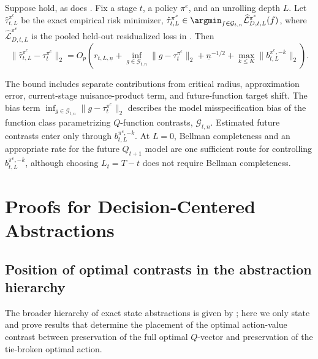 \documentclass[opre,nonblindrev]{informs4}
\let\arxivSavedArgmin\argmin
\let\argmin\undefined
\let\argmin\arxivSavedArgmin
\providecommand{\cG}{\mathcal G}
\newcommand{\norm}[1]{\lVert#1\rVert}
\newcommand{\blipadv}{\tau}
\begin{document}
\begin{theorem}\label{thm-mse-rates-policy-evaluation-apx}
Suppose
hold, as does .
Fix a stage $t$, a policy $\pi^e$, and an unrolling depth $L$.
Let $\hat\blipadv_{t,L}^{\pi^e}$ be the exact empirical risk minimizer,
$
\hat\blipadv_{t,L}^{\pi^e}
\in\argmin_{f\in\cG_{t,n}}
\widehat{\mathcal L}_{D,t,L}^{\pi^e}(f)$,
where $\widehat{\mathcal L}_{D,t,L}^{\pi^e}$ is the pooled held-out
residualized loss in . Then
\begin{equation}
\norm{\hat\blipadv_{t,L}^{\pi^e}-\blipadv_t^{\pi^e}}_2
=O_p\!\left(
r_{t,L,\underline n}
+\inf_{g\in\cG_{t,n}}\norm{g-\blipadv_t^{\pi^e}}_2
+\underline n^{-1/2}
+\max_{k\le K}\norm{b_{t,L}^{\pi^e,-k}}_2
\right).
\label{eq:diff-full-main-theorem}
\end{equation}
\end{theorem}

The bound includes separate contributions from critical radius, approximation error, current-stage
nuisance-product term, and future-function target shift.
The bias term $\inf_{g\in\cG_{t,n}}\norm{g-\blipadv_t^{\pi^e}}_2$ describes
the model misspecification bias of the function class parametrizing
$Q$-function contrasts, $\cG_{t,n}$.
Estimated future contrasts enter only through $b_{t,L}^{\pi^e,-k}$.
At $L=0$, Bellman completeness and an appropriate
rate for the future $Q_{t+1}$ model are one sufficient route for controlling
$b_{t,L}^{\pi^e,-k}$, although choosing $L_t =T-t$ does not require Bellman completeness. 
\section{Proofs for Decision-Centered Abstractions}
\label{apx-decision-centered-proofs}


\subsection{Position of optimal contrasts in the abstraction hierarchy}
\label{sec:ec-contrast-hierarchy}

The broader hierarchy of exact state abstractions is given by
\citet{li2006towards}; here we only state and prove results that determine the placement of the optimal
action-value contrast between preservation of the full optimal \(Q\)-vector
and preservation of the tie-broken optimal action.
\end{document}
